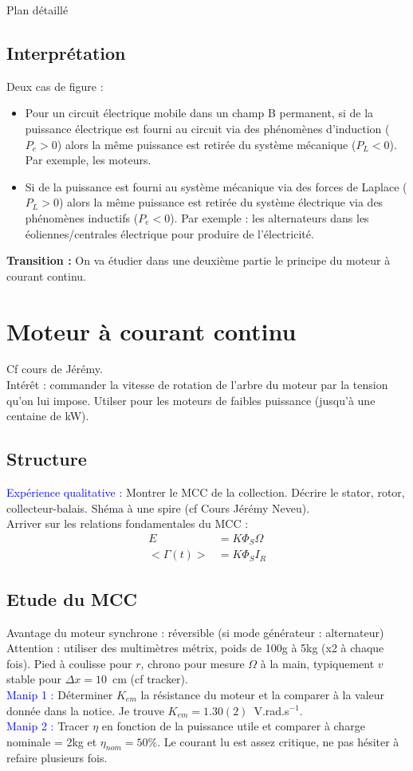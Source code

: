 \begin{reportBlock}{Plan détaillé}
\subsection{Interprétation}
Deux cas de figure :
\begin{itemize}
    \item Pour un circuit électrique mobile dans un champ B permanent, si de la puissance électrique est fourni au circuit via des phénomènes d'induction ($P_e>0$) alors la même puissance est retirée du système mécanique ($P_L<0$). Par exemple, les moteurs.
    \item Si de la puissance est fourni au système mécanique via des forces de Laplace ($P_L>0$) alors la même puissance est retirée du système électrique via des phénomènes inductifs ($P_e<0$). Par exemple : les alternateurs dans les éoliennes/centrales électrique pour produire de l'électricité.
\end{itemize}

\textbf{Transition :} On va étudier dans une deuxième partie le principe du moteur à courant continu.

\section{Moteur à courant continu}
Cf cours de Jérémy.\\
Intérêt : commander la vitesse de rotation de l'arbre du moteur par la tension qu'on lui impose. Utilser pour les moteurs de faibles puissance (jusqu'à une centaine de kW).
\subsection{Structure}
\textcolor{blue}{Expérience qualitative :} Montrer le MCC de la collection. Décrire le stator, rotor, collecteur-balais. Shéma à une spire (cf Cours Jérémy Neveu).\\
Arriver sur les relations fondamentales du MCC :
\begin{align}
    E &= K\Phi_S\Omega \\
    <\Gamma(t)> &= K\Phi_SI_R
\end{align}
    
\subsection{Etude du MCC}
Avantage du moteur synchrone : réversible (si mode générateur : alternateur)
Attention : utiliser des multimètres métrix, poids de 100g à 5kg (x2 à chaque fois). Pied à coulisse pour $r$, chrono pour mesure $\Omega$ à la main, typiquement $v$ stable pour $\Delta x=10$~cm (cf tracker).\\
\textcolor{blue}{Manip 1 : }Déterminer $K_{em}$ la résistance du moteur et la comparer à la valeur donnée dans la notice. Je trouve $K_{em}=1.30(2)$~V.rad.s$^{-1}$.\\
\textcolor{blue}{Manip 2 :} Tracer $\eta$ en fonction de la puissance utile et comparer à charge nominale = 2kg et $\eta_{nom}=50\%$. Le courant lu est assez critique, ne pas hésiter à refaire plusieurs fois.\\


\end{reportBlock}

